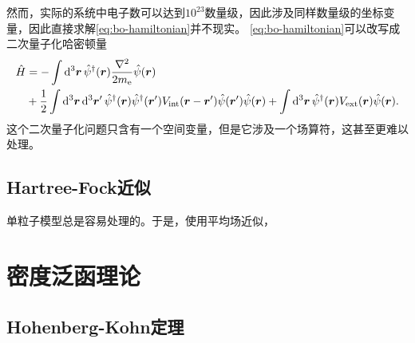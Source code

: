 \documentclass[hyperref, UTF8, a4paper]{ctexart}
\begin{document}
然而，实际的系统中电子数可以达到$10^{23}$数量级，因此涉及同样数量级的坐标变量，因此直接求解\eqref{eq:bo-hamiltonian}并不现实。
\eqref{eq:bo-hamiltonian}可以改写成二次量子化哈密顿量
\begin{equation}
    \begin{aligned}
        \hat{H} &= - \int \dd[3]{\vb*{r}} \hat{\psi}^\dagger(\vb*{r}) \frac{\laplacian}{2m_\text{e}} \hat{\psi}(\vb*{r}) \\
        &+ \frac{1}{2} \int \dd[3]{\vb*{r}} \dd[3]{\vb*{r}'} \hat{\psi}^\dagger (\vb*{r}) \hat{\psi}^\dagger (\vb*{r}') V_\text{int} (\vb*{r} - \vb*{r}') \hat{\psi}(\vb*{r}') \hat{\psi}(\vb*{r}) + \int \dd[3]{\vb*{r}} \hat{\psi}^\dagger(\vb*{r}) V_\text{ext}(\vb*{r}) \hat{\psi}(\vb*{r}).
    \end{aligned}
    \label{eq:bo-second-hamiltonian}
\end{equation}
这个二次量子化问题只含有一个空间变量，但是它涉及一个场算符，这甚至更难以处理。

\subsection{Hartree-Fock近似}

单粒子模型总是容易处理的。于是，使用平均场近似，

\section{密度泛函理论}

\subsection{Hohenberg-Kohn定理}
\end{document}
